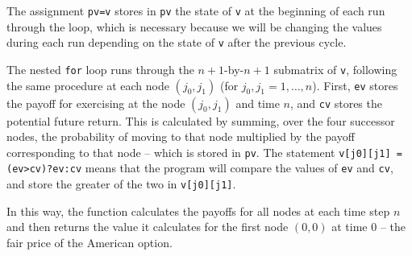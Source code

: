 \documentclass[12pt,a4paper]{article}
\begin{document}
The assignment \texttt{pv=v} stores in \texttt{pv} the state of \texttt{v} at 
the beginning of each run through the loop, which is necessary because we will 
be changing the values during each run depending on the state of \texttt{v} 
after the previous cycle.

The nested \texttt{for} loop runs through the $n+1$-by-$n+1$ submatrix of 
\texttt{v}, following the same procedure at each node $(j_0,j_1)$ (for 
$j_0,j_1=1,\dots,n$). First, \texttt{ev} stores the payoff for exercising at the 
node $(j_0,j_1)$ and time $n$, and \texttt{cv} stores the potential future 
return. This is calculated by summing, over the four successor nodes, the 
probability of moving to that node multiplied by the payoff corresponding to 
that node -- which is stored in \texttt{pv}.
The statement \texttt{v[j0][j1] = (ev>cv)?ev:cv} means that the program will 
compare the values of \texttt{ev} and \texttt{cv}, and store the greater of the 
two in \texttt{v[j0][j1]}.

In this way, the function calculates the payoffs for all nodes at each time step 
$n$ and then returns the value it calculates for the first node $(0,0)$ at time 
$0$ -- the fair price of the American option.
\end{document}
